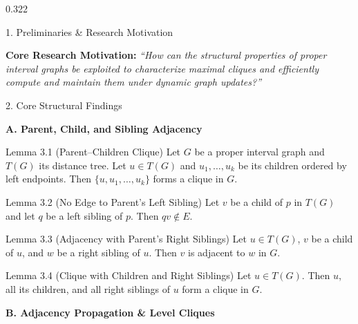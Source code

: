 \documentclass[final,17pt]{beamer}
\begin{document}
\begin{frame}[t]
\begin{columns}[t]
\begin{column}{0.322\textwidth}
\begin{posterbox}{1. Preliminaries \& Research Motivation}
{        \vspace{1.5pt}
        \begin{subbox}
            \textbf{Core Research Motivation:}
            \textit{``How can the structural properties of proper interval graphs be exploited to characterize maximal cliques and efficiently compute and maintain them under dynamic graph updates?''}
        \end{subbox}
        }
    \end{posterbox}

    \begin{posterbox}{2. Core Structural Findings}

        {\fontsize{11.5}{13.5}\selectfont \textbf{\color{subHeaderNavy}A. Parent, Child, and Sibling Adjacency}}

        \begin{lemmabox}{Lemma 3.1 (Parent--Children Clique)}
            Let $G$ be a proper interval graph and $T(G)$ its distance tree. Let $u \in T(G)$ and $u_1, \dots, u_k$ be its children ordered by left endpoints. Then $\{u, u_1, \dots, u_k\}$ forms a clique in $G$.
        \end{lemmabox}

        \begin{lemmabox}{Lemma 3.2 (No Edge to Parent's Left Sibling)}
            Let $v$ be a child of $p$ in $T(G)$ and let $q$ be a left sibling of $p$. Then $qv \notin E$.
        \end{lemmabox}

        \begin{lemmabox}{Lemma 3.3 (Adjacency with Parent's Right Siblings)}
            Let $u \in T(G)$, $v$ be a child of $u$, and $w$ be a right sibling of $u$. Then $v$ is adjacent to $w$ in $G$.
        \end{lemmabox}

        \begin{lemmabox}{Lemma 3.4 (Clique with Children and Right Siblings)}
            Let $u \in T(G)$. Then $u$, all its children, and all right siblings of $u$ form a clique in $G$.
        \end{lemmabox}

        \vspace{0.8pt}
        {\fontsize{11.5}{13.5}\selectfont \textbf{\color{subHeaderNavy}B. Adjacency Propagation \& Level Cliques}}


\end{posterbox}
\end{column}
\end{columns}
\end{frame}
\end{document}
